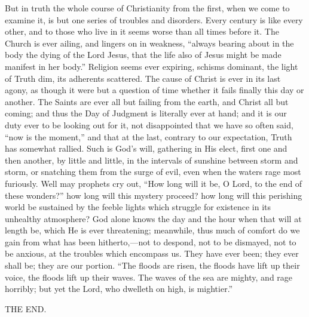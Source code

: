 But in truth the whole course of Christianity from the first, when
we come to examine it, is but one series of troubles and disorders.
Every century is like every other, and to those who live in it seems
worse than all times before it. The Church is ever ailing, and lingers
on in weakness, ``always bearing about in the body the dying
of the Lord Jesus, that the life also of Jesus might be made manifest
in her body.'' Religion seems ever expiring, schisms dominant, the
light of Truth dim, its adherents scattered. The cause of Christ is
ever in its last agony, as though it were but a question of time
whether it fails finally this day or another. The Saints are ever all
but failing from the earth, and Christ all but coming; and thus the
Day of Judgment is literally ever at hand; and it is our duty ever to
be looking out for it, not disappointed that we have so often said,
``now is the moment,'' and that at the last, contrary to our
expectation, Truth has somewhat rallied. Such is God's will, gathering
in His elect, first one and then another, by little and little, in the
intervals of sunshine between storm and storm, or snatching them from
the surge of evil, even when the waters rage most furiously. Well may
prophets cry out, ``How long will it be, O Lord, to the end of
these wonders?'' how long will this mystery proceed? how long will
this perishing world be sustained by the feeble lights which struggle
for existence in its unhealthy atmosphere? God alone knows the day and
the hour when that will at length be, which He is ever threatening;
meanwhile, thus much of comfort do we gain from what has been
hitherto,—not to despond, not to be dismayed, not to be anxious, at
the troubles which encompass us. They have ever been; they ever shall
be; they are our portion. ``The floods are risen, the floods have
lift up their voice, the floods lift up their waves. The waves of the
sea are mighty, and rage horribly; but yet the Lord, who dwelleth on
high, is mightier.''

THE END.
